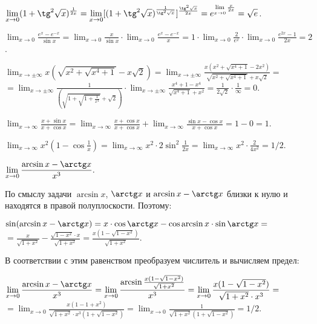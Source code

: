 \documentclass[a5paper,10pt]{article}
\begin{document}
\medskip
{} $\displaystyle\lim_{x\to 0}
(1+\tg^2\sqrt{x})^{\frac{1}{2x}}=
\lim_{x\to 0}[(1+\tg^2\sqrt{x})^{\frac{1}{\tg^2\sqrt x}}]^
{\frac{\tg^2\sqrt x}{2x}}=
e^{\lim\limits_{x\to 0}\frac{x}{2x}}=\sqrt e$.

\medskip
{} $\displaystyle\lim_{x\to 0}
\frac{e^x-e^{-x}}{\sin x}=\lim_{x\to 0}\frac{x}{\sin x}\cdot
\lim_{x\to 0}\frac{e^x-e^{-x}}{x}=
1\cdot\lim_{x\to 0}\frac{2}{e^x}\cdot\lim_{x\to 0}\frac{e^{2x}-1}{2x}=2$.

\medskip
{} $\displaystyle\lim_{x\to \pm\infty}
x(\sqrt{x^2+\sqrt{x^4+1}}-x\sqrt2)=
\lim_{x\to \pm\infty}\frac{x(x^2+\sqrt{x^4+1}-2x^2)}
{\sqrt{x^2+\sqrt{x^4+1}}+x\sqrt2}=$\\
$\displaystyle=\lim_{x\to \pm\infty}\frac{1}{\left(\sqrt{1+\sqrt{1+\frac{1}{x^4}}}+\sqrt2\right)}\cdot
\lim_{x\to \pm\infty}\frac{x^4+1-x^4}{\sqrt{x^4+1}+x^2}=
\frac{1}{2\sqrt2}\cdot\frac{1}{\infty}=0$.

\medskip
{} $\displaystyle\lim_{x\to\infty}
\frac{x+\sin x}{x+\cos x}=\lim_{x\to\infty}\frac{x+\cos x}{x+\cos x}+
\lim_{x\to\infty}\frac{\sin x-\cos x}{x+\cos x}=1-0=1$.

\medskip
{} $\displaystyle\lim_{x\to \infty}
x^2(1-\cos\frac{1}{x})=\lim_{x\to\infty}x^2\cdot2\sin^2\frac{1}{2x}=
\lim_{x\to\infty}x^2\cdot\frac{2}{4x^2}=1/2$.

\medskip
{} $\displaystyle\lim_{x\to 0}
\frac{\arcsin x-\arctg x}{x^3}.$

\noindent
По смыслу задачи $\arcsin x$, $\arctg x$ и $\arcsin x-\arctg x$
близки к нулю и находятся в правой полуплоскости. Поэтому:

\noindent
$\displaystyle\sin(\arcsin x-\arctg x)=
x\cdot\cos\arctg x-\cos\arcsin x\cdot\sin\arctg x=$\\
$\displaystyle =\frac{x}{\sqrt{1+x^2}}-\frac{\sqrt{1-x^2}\cdot x}{\sqrt{1+x^2}}=
\frac{x(1-\sqrt{1-x^2})}{\sqrt{1+x^2}}$.

\noindent
В соответствии с этим равенством преобразуем числитель и вычисляем предел:

\noindent
$\displaystyle\lim_{x\to 0}\frac{\arcsin x-\arctg x}{x^3}=
\lim_{x\to 0}\frac{\arcsin\frac{x(1-\sqrt{1-x^2})}{\sqrt{1+x^2}}}{x^3}=
\lim_{x\to 0}\frac{x(1-\sqrt{1-x^2})}{\sqrt{1+x^2}\cdot x^3}=$\\
$\displaystyle=\lim_{x\to 0}\frac{x(1-1+x^2)}{\sqrt{1+x^2}\cdot x^3(1+\sqrt{1-x^2})}=
\lim_{x\to 0}\frac{1}{\sqrt{1+x^2}(1+\sqrt{1-x^2})}=1/2$.
\end{document}
